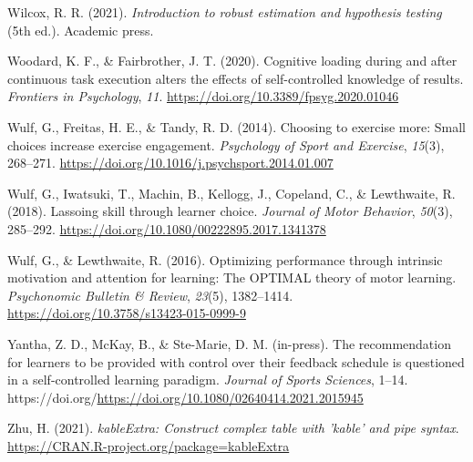 \documentclass[
  man, donotrepeattitle,floatsintext]{apa7}
\newlength{\cslhangindent}
\newlength{\cslentryspacingunit} %
\newenvironment{CSLReferences}[2] %
 {%
  \setlength{\parindent}{0pt}
  \ifodd #1
  \let\oldpar\par
  \def\par{\hangindent=\cslhangindent\oldpar}
  \fi
  \setlength{\parskip}{#2\cslentryspacingunit}
 }%
 {}
\begin{document}
\begin{CSLReferences}{1}{0}
\leavevmode{}%
Wilcox, R. R. (2021). \emph{Introduction to robust estimation and hypothesis testing} (5th ed.). Academic press.

\leavevmode{}%
Woodard, K. F., \& Fairbrother, J. T. (2020). Cognitive loading during and after continuous task execution alters the effects of self-controlled knowledge of results. \emph{Frontiers in Psychology}, \emph{11}. \url{https://doi.org/10.3389/fpsyg.2020.01046}

\leavevmode{}%
Wulf, G., Freitas, H. E., \& Tandy, R. D. (2014). Choosing to exercise more: {Small} choices increase exercise engagement. \emph{Psychology of Sport and Exercise}, \emph{15}(3), 268--271. \url{https://doi.org/10.1016/j.psychsport.2014.01.007}

\leavevmode{}%
Wulf, G., Iwatsuki, T., Machin, B., Kellogg, J., Copeland, C., \& Lewthwaite, R. (2018). Lassoing skill through learner choice. \emph{Journal of Motor Behavior}, \emph{50}(3), 285--292. \url{https://doi.org/10.1080/00222895.2017.1341378}

\leavevmode{}%
Wulf, G., \& Lewthwaite, R. (2016). Optimizing performance through intrinsic motivation and attention for learning: {The} {OPTIMAL} theory of motor learning. \emph{Psychonomic Bulletin \& Review}, \emph{23}(5), 1382--1414. \url{https://doi.org/10.3758/s13423-015-0999-9}

\leavevmode{}%
Yantha, Z. D., McKay, B., \& Ste-Marie, D. M. (in-press). The recommendation for learners to be provided with control over their feedback schedule is questioned in a self-controlled learning paradigm. \emph{Journal of Sports Sciences}, 1--14. https://doi.org/\url{https://doi.org/10.1080/02640414.2021.2015945}

\leavevmode{}%
Zhu, H. (2021). \emph{kableExtra: Construct complex table with 'kable' and pipe syntax}. \url{https://CRAN.R-project.org/package=kableExtra}

\end{CSLReferences}
\end{document}
